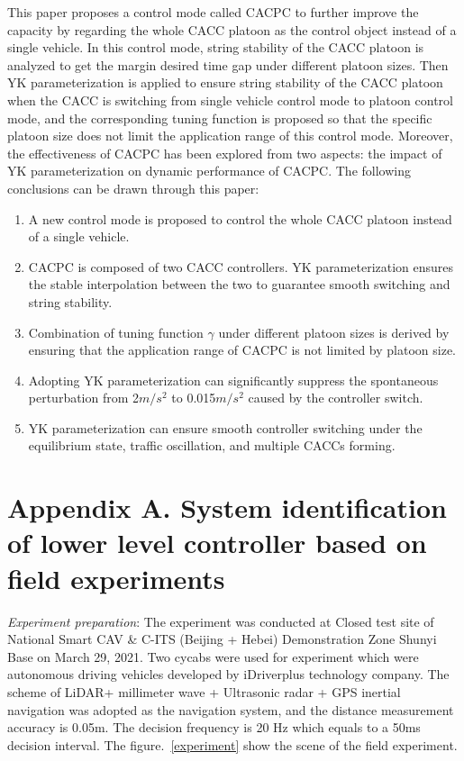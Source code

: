 \documentclass[journal]{IEEEtran}
\begin{document}
This paper proposes a control mode called CACPC to further improve the capacity by regarding the whole CACC platoon as the control object instead of a single vehicle. In this control mode, string stability of the CACC platoon is analyzed to get the margin desired time gap under different platoon sizes. Then YK parameterization is applied to ensure string stability of the CACC platoon when the CACC is switching from single vehicle control mode to platoon control mode, and the corresponding tuning function is proposed so that the specific platoon size does not limit the application range of this control mode. Moreover, the effectiveness of CACPC has been explored from two aspects: the impact of YK parameterization on dynamic performance of CACPC. The following conclusions can be drawn through this paper:
\begin{enumerate}
  \item A new control mode is proposed to control the whole CACC platoon instead of a single vehicle.
  \item CACPC is composed of two CACC controllers. YK parameterization ensures the stable interpolation between the two to guarantee smooth switching and string stability.
  \item Combination of tuning function $\gamma$ under different platoon sizes is derived by ensuring that the application range of CACPC is not limited by platoon size.
  \item Adopting YK parameterization can significantly suppress the spontaneous perturbation from 2$m/s^2$ to 0.015$m/s^2$ caused by the controller switch.
  \item YK parameterization can ensure smooth controller switching under the equilibrium state, traffic oscillation, and multiple CACCs forming.
\end{enumerate}




\appendices
\section*{Appendix A. System identification of lower level controller based on field experiments}
\label{AppendixA}

\textit{Experiment preparation}: The experiment was conducted at Closed test site of National Smart CAV \& C-ITS (Beijing + Hebei) Demonstration Zone Shunyi Base on March 29, 2021. Two cycabs were used for experiment which were autonomous driving vehicles developed by iDriverplus technology company. The scheme of LiDAR+ millimeter wave + Ultrasonic radar + GPS inertial navigation was adopted as the navigation system, and the distance measurement accuracy is 0.05m. The decision frequency is 20 Hz which equals to a 50ms decision interval. The figure.~\ref{experiment} show the scene of the field experiment.
\end{document}
